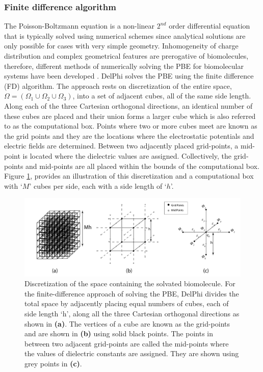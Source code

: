 \documentclass[9pt,tutorial,pubversion]{livecoms}
\begin{document}
\subsubsection{Finite difference algorithm}
The Poisson-Boltzmann equation is a non-linear $2^{nd}$ order differential equation that is typically solved using numerical schemes since analytical solutions are only possible for cases with very simple geometry. Inhomogeneity of charge distribution and complex geometrical features are prerogative of biomolecules, therefore, different methods of numerically solving the PBE for biomolecular systems have been developed \cite{klapper1986focusing,davis1989solving,cortis1997numerical,baker2001electrostatics,shestakov2002solution,miertuvs1981electrostatic,totrov2001rapid,lu2009adaptive}. 
DelPhi solves the PBE using the finite difference (FD) algorithm. The approach rests on discretization of the entire space, $ \Omega=(\Omega_1 \cup \Omega_2 \cup \Omega_3)$, into a set of adjacent cubes, all of the same side length. Along each of the three Cartesian orthogonal directions, an identical number of these cubes are placed and their union forms a larger cube which is also referred to as the computational box. Points where two or more cubes meet are known as the grid points and they are the locations where the electrostatic potentials and electric fields are determined.  Between two adjacently placed grid-points, a mid-point is located where the dielectric values are assigned. Collectively, the grid-points and mid-points are all placed within the bounds of the computational box. Figure \ref{fig:grid-scheme-representation}, provides an illustration of this discretization and a computational box with ‘$ M $’ cubes per side, each with a side length of ‘$ h $’. 

\begin{figure}
\includegraphics[width=0.95\linewidth]{Figure_3.png}
\caption{Discretization of the space containing the solvated biomolecule. For the finite-difference approach of solving the PBE, DelPhi divides the total space by adjacently placing equal numbers of cubes, each of side length ‘h’, along all the three Cartesian orthogonal directions as shown in \textbf{(a)}. The vertices of a cube are known as the grid-points and are shown in \textbf{(b)} using solid black points. The points in between two adjacent grid-points are called the mid-points where the values of dielectric constants are assigned. They are shown using grey points in \textbf{(c)}.}
\label{fig:grid-scheme-representation}
\end{figure}
 
\end{document}
